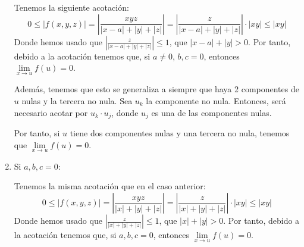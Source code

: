 \begin{ejercicio}
\begin{enumerate}
        Tenemos la siguiente acotación:
        \begin{equation*}
            0\leq |f(x,y,z)| =\left|\frac{xyz}{|x-a|+|y|+|z|}\right| = \left|\frac{z}{|x-a|+|y|+|z|}\right|\cdot |xy| \leq |xy|
        \end{equation*}
        Donde hemos usado que $\left|\frac{z}{|x-a|+|y|+|z|}\right|\leq 1$, que $|x-a|+|y|>0$. Por tanto, debido a la acotación tenemos que, si $a\neq 0$, $b,c=0$, entonces $\lim\limits_{x\to u}f(u)=0$.
        
        Además, tenemos que esto se generaliza a siempre que haya 2 componentes de $u$ nulas y la tercera no nula. Sea $u_k$ la componente no nula. Entonces, será necesario acotar por $u_k\cdot u_j$, donde $u_j$ es una de las componentes nulas.

        Por tanto, si $u$ tiene dos componentes nulas y una tercera no nula, tenemos que $\lim\limits_{x\to u}f(u)=0$.

        \item Si $a,b,c=0$:

        Tenemos la misma acotación que en el caso anterior:
        \begin{equation*}
            0\leq |f(x,y,z)| =\left|\frac{xyz}{|x|+|y|+|z|}\right| = \left|\frac{z}{|x|+|y|+|z|}\right|\cdot |xy| \leq |xy|
        \end{equation*}
        Donde hemos usado que $\left|\frac{z}{|x|+|y|+|z|}\right|\leq 1$, que $|x|+|y|>0$. Por tanto, debido a la acotación tenemos que, si $a,b,c=0$, entonces $\lim\limits_{x\to u}f(u)=0$.
    \end{enumerate}
\end{ejercicio}


